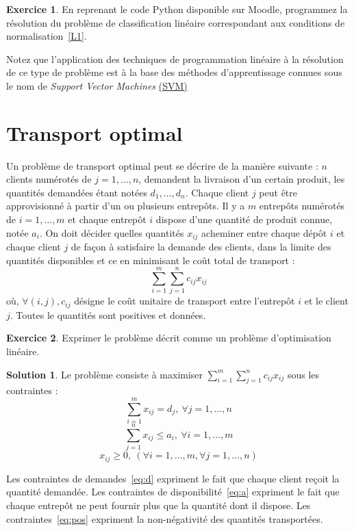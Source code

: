 \documentclass[a4paper,francais]{article}
\theoremstyle{definition}
\newtheorem{exercice}{Exercice}[section]
\newtheorem*{solution}{Solution}
\begin{document}
\begin{exercice}
  En reprenant le code Python disponible sur Moodle, programmez la résolution du problème
  de classification linéaire correspondant aux conditions de normalisation~\ref{L1}. 
\end{exercice}

Notez que l'application des techniques de programmation linéaire à la résolution de ce type de problème
est à la base des méthodes d'apprentissage connues sous le nom de \emph{Support Vector Machines}
\href{https://en.wikipedia.org/wiki/Support-vector_machine}{(SVM)}

\section{Transport optimal}
\label{sec:transport}

Un problème de transport optimal peut se décrire de la manière suivante :
$n$ clients numérotés de $j = 1, \dots, n$, demandent la livraison d'un
certain produit, les quantités demandées étant notées $d_1, \dots, d_n$.
Chaque client $j$ peut être approvisionné à partir d'un ou plusieurs entrepôts.
Il y a $m$ entrepôts numérotés de $i = 1, \dots, m$ et chaque entrepôt $i$
dispose d'une quantité de produit connue, notée $a_i$. On doit décider quelles
quantités $x_{ij}$ acheminer entre chaque dépôt $i$ et chaque client $j$ de façon
à satisfaire la demande des clients, dans la limite des quantités disponibles
et ce en minimisant le coût total de transport :
\[
\sum_{i = 1}^m \sum_{j = 1}^{n} c_{ij}x_{ij}
\]
où, $\forall (i,j), c_{ij}$ désigne le coût unitaire de transport entre l'entrepôt
$i$ et le client $j$. Toutes le quantités sont positives et données.

\begin{exercice}
Exprimer le problème décrit comme un problème d'optimisation linéaire.%
\end{exercice}

\begin{solution}
  Le problème consiste à maximiser $\sum_{i = 1}^m \sum_{j = 1}^{n} c_{ij}x_{ij}$ sous les con\-traintes : 
  \begin{equation}
    \label{eq:d}
    \sum_{i = 1}^m x_{ij} = d_j, \ \forall j = 1, \dots, n
  \end{equation}
  \begin{equation}
    \label{eq:a}
    \sum_{j = 1}^n x_{ij} \leq a_i, \ \forall i = 1, \dots, m
  \end{equation}
  \begin{equation}
    \label{eq:pos}
    x_{ij} \geq 0, \ (\forall i = 1, \dots, m, \forall j = 1, \dots, n )
  \end{equation}

  Les contraintes de demandes~\ref{eq:d} expriment le fait que chaque client reçoit la quantité demandée.
  Les contraintes de disponibilité~\ref{eq:a} expriment le fait que chaque entrepôt ne peut fournir plus
  que la quantité dont il dispose. Les con\-traintes~\ref{eq:pos} expriment la non-négativité des quantités
  transportées. 
\end{solution}
\end{document}
